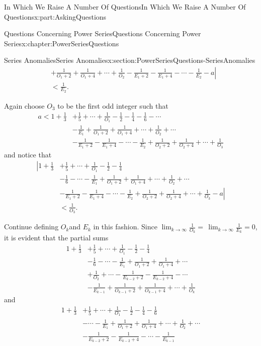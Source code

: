 \documentclass[oneside,10pt,]{book}
\numberwithin{equation}{section}
\newcommand{\lt}{<}
\newcommand{\amp}{&}
\begin{document}
\begin{partptx}{In Which We Raise A Number Of Questions}{}{In Which We Raise A Number Of Questions}{}{}{x:part:AskingQuestions}
\begin{chapterptx}{Questions Concerning Power Series}{}{Questions Concerning Power Series}{}{}{x:chapter:PowerSeriesQuestions}
\begin{sectionptx}{Series Anomalies}{}{Series Anomalies}{}{}{x:section:PowerSeriesQuestions-SeriesAnomalies}
\begin{align*}
\amp +\frac{1}{O_1+2}+\frac{1}{O_1+4}+\cdots+\frac{1}{O_2}- \frac{1}{E_1+2}-\frac{1}{E_1+4}-\cdots-\left.\frac{1}{E_2}-a\right|\\
\amp \lt \frac{1}{E_2}\text{.}
\end{align*}
%
\par
Again choose \(O_3\) to be the first odd integer such that%
\begin{align*}
a\lt 1+\frac{1}{3}\amp +\frac{1}{5}+\cdots+\frac{1}{O_1}-\frac{1}{2}-\frac{1}{4}- \frac{1}{6}-\cdots\\
\amp -\frac{1}{E_1}+\frac{1}{O_1+2}+\frac{1}{O_1+4}+\cdots+ \frac{1}{O_2}+ \cdots\\
\amp -\frac{1}{E_1+2}-\frac{1}{E_1+4}-\cdots-\frac{1}{E_2}+\frac{1}{O_2+2}+ \frac{1}{O_2+4}+\cdots+\frac{1}{O_3}
\end{align*}
and notice that%
\begin{align*}
\left|1+\frac{1}{3}\right.\amp +\frac{1}{5}+\cdots+\frac{1}{O_1}-\frac{1}{2}-\frac{1}{4}\\
\amp -\frac{1}{6}-\cdots-\frac{1}{E_1}+\frac{1}{O_1+2}+\frac{1}{O_1+4}+\cdots+ \frac{1}{O_2}+\cdots\\
\amp -\frac{1}{E_1+2}-\frac{1}{E_1+4}-\cdots-\frac{1}{E_2}+\frac{1}{O_2+2}+ \frac{1}{O_2+4}+\cdots+\left.\frac{1}{O_3}-a\right|\\
\amp \lt \frac{1}{O_3}\text{.}
\end{align*}
%
\par
Continue defining \(O_k\)and \(E_k\) in this fashion. Since \(\lim_{k\rightarrow\infty}\frac{1}{O_k}=\,\lim_{k\rightarrow\infty} \frac{1}{E_k}=0\), it is evident that the partial sums%
\begin{align*}
1+\frac{1}{3}\amp +\frac{1}{5}+\cdots+\frac{1}{O_1}-\frac{1}{2}-\frac{1}{4}\\
\amp -\frac{1}{6}-\cdots-\frac{1}{E_1}+\frac{1}{O_1+2}+\frac{1}{O_1+4}+\cdots\\
\amp + \frac{1}{O_2}+\cdots -\frac{1}{E_{k-2}+2}-\frac{1}{E_{k-2}+4}-\cdots\\
\amp -\frac{1}{E_{k-1}}+  \frac{1}{O_{k-1}+2}+\frac{1}{O_{k-1}+4}+\cdots+\frac{1}{O_k}
\end{align*}
and%
\begin{align*}
1+\frac{1}{3}\amp +\frac{1}{5}+\cdots+\frac{1}{O_1}-\frac{1}{2}-\frac{1}{4}- \frac{1}{6}\\
\amp -\cdots-\frac{1}{E_1}+\frac{1}{O_1+2}+\frac{1}{O_1+4}+\cdots+ \frac{1}{O_2}+\cdots\\
\amp -\frac{1}{E_{k-2}+2}-\frac{1}{E_{k-2}+4}-\cdots-\frac{1}{E_{k-1}}

\end{align*}
\end{sectionptx}
\end{chapterptx}
\end{partptx}
\end{document}
